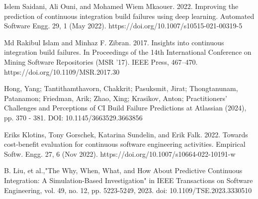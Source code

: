 \begin{thebibliography}{8}
Islem Saidani, Ali Ouni, and Mohamed Wiem Mkaouer. 2022. Improving the prediction of continuous
integration build failures using deep learning. Automated Software Engg. 29, 1 (May 2022).
https://doi.org/10.1007/s10515-021-00319-5

Md Rakibul Islam and Minhaz F. Zibran. 2017. Insights into continuous integration build failures.
In Proceedings of the 14th International Conference on Mining Software Repositories (MSR '17).
IEEE Press, 467–470. https://doi.org/10.1109/MSR.2017.30

Hong, Yang; Tantithamthavorn, Chakkrit; Pasuksmit, Jirat; Thongtanunam, Patanamon; Friedman, Arik;
Zhao, Xing; Krasikov, Anton; Practitioners’ Challenges and Perceptions of CI Build Failure
Predictions at Atlassian (2024), pp. 370 - 381. DOI: 10.1145/3663529.3663856

Eriks Klotins, Tony Gorschek, Katarina Sundelin, and Erik Falk. 2022. Towards cost-benefit
evaluation for continuous software engineering activities. Empirical Softw. Engg. 27, 6 (Nov
2022). https://doi.org/10.1007/s10664-022-10191-w

B. Liu, et al.,"The Why, When, What, and How About Predictive Continuous Integration: A
Simulation-Based Investigation" in IEEE Transactions on Software Engineering, vol. 49, no. 12, pp.
5223-5249, 2023. doi: 10.1109/TSE.2023.3330510

\end{thebibliography}